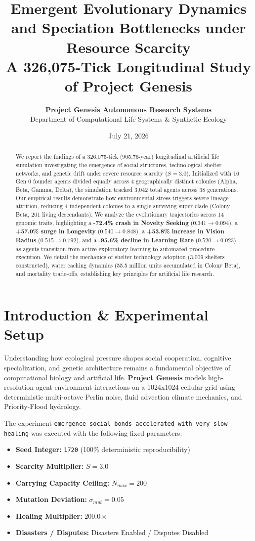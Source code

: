 \documentclass[11pt,a4paper,twocolumn]{article}
\title{\textbf{\Large Emergent Evolutionary Dynamics and Speciation Bottlenecks under Resource Scarcity}\\
\large A 326,075-Tick Longitudinal Study of Project Genesis}
\author{\textbf{Project Genesis Autonomous Research Systems}\\
\small Department of Computational Life Systems \& Synthetic Ecology}
\date{July 21, 2026}
\begin{document}
\maketitle

\begin{abstract}
We report the findings of a 326,075-tick (905.76-year) longitudinal artificial life simulation investigating the emergence of social structures, technological shelter networks, and genetic drift under severe resource scarcity ($S = 3.0$). Initialized with 16 Gen 0 founder agents divided equally across 4 geographically distinct colonies (Alpha, Beta, Gamma, Delta), the simulation tracked 3,042 total agents across 38 generations. Our empirical results demonstrate how environmental stress triggers severe lineage attrition, reducing 4 independent colonies to a single surviving super-clade (Colony Beta, 201 living descendants). We analyze the evolutionary trajectories across 14 genomic traits, highlighting a \textbf{-72.4\% crash in Novelty Seeking} ($0.341 \to 0.094$), a \textbf{+57.0\% surge in Longevity} ($0.540 \to 0.848$), a \textbf{+53.8\% increase in Vision Radius} ($0.515 \to 0.792$), and a \textbf{-95.6\% decline in Learning Rate} ($0.520 \to 0.023$) as agents transition from active exploratory learning to automated procedure execution. We detail the mechanics of shelter technology adoption (3,009 shelters constructed), water caching dynamics (55.5 million units accumulated in Colony Beta), and mortality trade-offs, establishing key principles for artificial life research.
\end{abstract}

\section{Introduction \& Experimental Setup}
Understanding how ecological pressure shapes social cooperation, cognitive specialization, and genetic architecture remains a fundamental objective of computational biology and artificial life. \textbf{Project Genesis} models high-resolution agent-environment interactions on a 1024x1024 cellular grid using deterministic multi-octave Perlin noise, fluid advection climate mechanics, and Priority-Flood hydrology.

The experiment \texttt{emergence\_social\_bonds\_accelerated with very slow healing} was executed with the following fixed parameters:
\begin{itemize}
    \item \textbf{Seed Integer:} \texttt{1720} (100\% deterministic reproducibility)
    \item \textbf{Scarcity Multiplier:} $S = 3.0$
    \item \textbf{Carrying Capacity Ceiling:} $N_{max} = 200$
    \item \textbf{Mutation Deviation:} $\sigma_{mut} = 0.05$
    \item \textbf{Healing Multiplier:} $200.0\times$
    \item \textbf{Disasters / Disputes:} Disasters Enabled / Disputes Disabled
\end{itemize}
\end{document}

